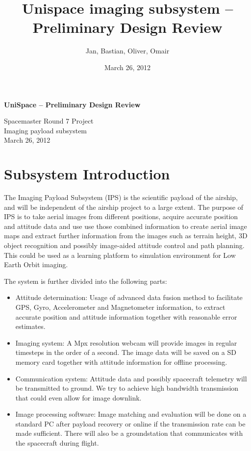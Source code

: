 \documentclass[fontsize=11pt,paper=a4,]{scrartcl}
\begin{document}
\sloppy
\thispagestyle{plain}
\begin{center}
\title{Unispace imaging subsystem -- Preliminary Design Review}
\author{Jan, Bastian, Oliver, Omair}
\date{March 26, 2012}


{\bf{\textsf{\huge UniSpace -- Preliminary Design Review}}}\\[\baselineskip]
\begin{Large}
Spacemaster Round 7 Project\\[\baselineskip]
Imaging payload subsystem\\
March 26, 2012\\
\end{Large}
\end{center}
\newpage

\tableofcontents
\newpage

\section{Subsystem Introduction}
The Imaging Payload Subsystem (IPS) is the scientific payload of the airship, and will be independent of the airship project to a large extent.
The purpose of IPS is to take aerial images from different positions, acquire accurate position and attitude data and use use those combined information to create aerial image maps and extract further information from the images such as terrain height, 3D object recognition and possibly image-aided attitude control and path planning.
This could be used as a learning platform to simulation environment for Low Earth Orbit imaging.

The system is further divided into the following parts:
\begin{itemize}
\item Attitude determination: Usage of advanced data fusion method to facilitate GPS, Gyro, Accelerometer and Magnetometer information, to extract accurate position and attitude information together with reasonable error estimates.
\item Imaging system: A Mpx resolution webcam will provide images in regular timesteps in the order of a second.
The image data will be saved on a SD memory card together with attitude information for offline processing.
\item Communication system: Attitude data and possibly spacecraft telemetry will be transmitted to ground.
We try to achieve high bandwidth transmission that could even allow for image downlink.
\item Image processing software:
Image matching and evaluation will be done on a standard PC after payload recovery or online if the transmission rate can be made sufficient.
There will also be a groundstation that communicates with the spacecraft during flight.
\end{itemize}
\end{document}
